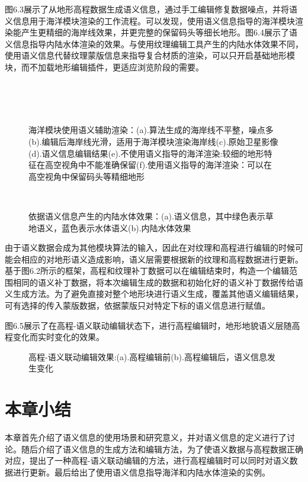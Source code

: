 图6.3展示了从地形高程数据生成语义信息，通过手工编辑修复数据噪点，并将语义信息用于海洋模块渲染的工作流程。可以发现，使用语义信息指导的海洋模块渲染能产生更精细的海岸线效果，并更完整的保留码头等细长地形。图6.4展示了语义信息指导内陆水体渲染的效果。与使用纹理编辑工具产生的内陆水体效果不同，使用语义信息代替纹理蒙版信息来指导复合材质的渲染，可以只开启基础地形模块，而不加载地形编辑插件，更适应浏览阶段的需要。\par
\newpage
\begin{figure}[H]
    \centering
     \\
     \\
     \\
    \caption{海洋模块使用语义辅助渲染：(a).算法生成的海岸线不平整，噪点多(b).编辑后海岸线光滑，适用于海洋模块渲染海岸线(c).原始卫星影像(d).语义信息编辑结果(e).不使用语义指导的海洋渲染:较细的地形特征在高空视角中不能准确保留(f).使用语义指导的海洋渲染：可以在高空视角中保留码头等精细地形}
\end{figure}

\begin{figure}[H]
    \centering
    \\
    \caption{依据语义信息产生的内陆水体效果：(a).语义信息，其中绿色表示草地语义，蓝色表示水体语义(b).内陆水体效果}
\end{figure}

由于语义数据会成为其他模块算法的输入，因此在对纹理和高程进行编辑的时候可能会相应的对地形语义造成影响，语义层需要根据新的纹理和高程数据进行更新。基于图6.2所示的框架，高程和纹理补丁数据可以在编辑结束时，构造一个编辑范围相同的语义补丁数据，将本次编辑生成的数据和初始化好的语义补丁数据传给语义生成方法。为了避免直接对整个地形块进行语义生成，覆盖其他语义编辑结果，可有选择的传入蒙版数据，依据蒙版只对特定下标的语义信息进行赋值。\par
图6.5展示了在高程-语义联动编辑状态下，进行高程编辑时，地形地貌语义层随高程变化而实时变化的效果。
\begin{figure}[H]
    \centering
    \caption{高程-语义联动编辑效果:(a).高程编辑前(b).高程编辑后，语义信息发生变化}
\end{figure}

\section{本章小结}
本章首先介绍了语义信息的使用场景和研究意义，并对语义信息的定义进行了讨论。随后介绍了语义信息的生成方法和编辑方法，为了使语义数据与高程数据正确对应，提出了一种高程-语义联动编辑的方法，进行高程编辑时可以同时对语义数据进行更新。最后给出了使用语义信息指导海洋和内陆水体渲染的实例。